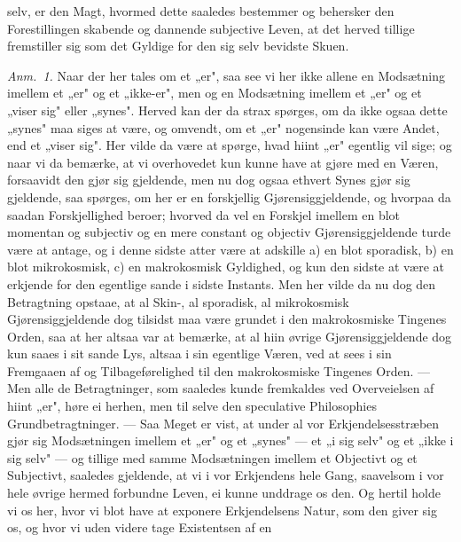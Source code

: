 \documentclass[12pt,a4paper]{book}
\newcommand{\apage}[1]{\marginnote{\footnotesize\textit{[#1]}}}
\begin{document}
selv, er den Magt, hvormed dette saaledes bestemmer og behersker den
Forestillingen skabende og dannende subjective Leven, at det herved tillige
fremstiller sig som det Gyldige for den sig selv bevidste Skuen.
  \apage{9}
{\small

\emph{Anm.~1.} Naar der her tales om et „er", saa see vi her ikke allene
en Modsætning imellem et „er" og et „ikke-er", men og en Modsætning imellem et
„er" og et „viser sig" eller „synes". Herved kan der da strax spørges, om da
ikke ogsaa dette „synes" maa siges at være, og omvendt, om et „er" nogensinde
kan være Andet, end et „viser sig". Her vilde da være at spørge, hvad hiint
„er" egentlig vil sige; og naar vi da bemærke, at vi overhovedet kun kunne have
at gjøre med en Væren, forsaavidt den gjør sig gjeldende, men nu dog ogsaa
ethvert Synes gjør sig gjeldende, saa spørges, om her er en forskjellig
Gjørensiggjeldende, og hvorpaa da saadan Forskjellighed beroer; hvorved da vel
en Forskjel imellem en blot momentan og subjectiv og en mere constant og
objectiv Gjørensiggjeldende turde være at antage, og i denne sidste atter være
at adskille a) en blot sporadisk, b) en blot mikrokosmisk, c) en makrokosmisk
Gyldighed, og kun den sidste at være at erkjende for den egentlige sande i
sidste Instants. Men her vilde da nu dog den Betragtning opstaae, at al Skin-,
al sporadisk, al mikrokosmisk Gjørensiggjeldende dog tilsidst maa være grundet i
den makrokosmiske Tingenes Orden, saa at her altsaa var at bemærke, at al hiin
øvrige Gjørensiggjeldende dog kun saaes i sit sande Lys, altsaa i sin egentlige
Væren, ved at sees i sin Fremgaaen af og Tilbageførelighed til den makrokosmiske
Tingenes Orden. --- Men alle de Betragtninger, som saaledes kunde fremkaldes ved
Overveielsen af hiint „er", høre ei herhen, men til selve den speculative
Philosophies Grundbetragtninger. --- Saa Meget er vist, at under al vor
Erkjendelsesstræben gjør sig Modsætningen imellem et „er" og et „synes" --- et
„i sig selv" og et „ikke i sig selv" --- og tillige med samme Modsætningen
imellem et Objectivt og et Subjectivt, saaledes gjeldende, at vi i vor Erkjendens
hele Gang, saavelsom i vor hele øvrige hermed forbundne Leven, ei kunne unddrage
os den. Og hertil holde vi os her, hvor vi blot have at exponere Erkjendelsens
Natur, som den giver sig os, og hvor vi uden videre tage Existentsen af en
}
\end{document}
